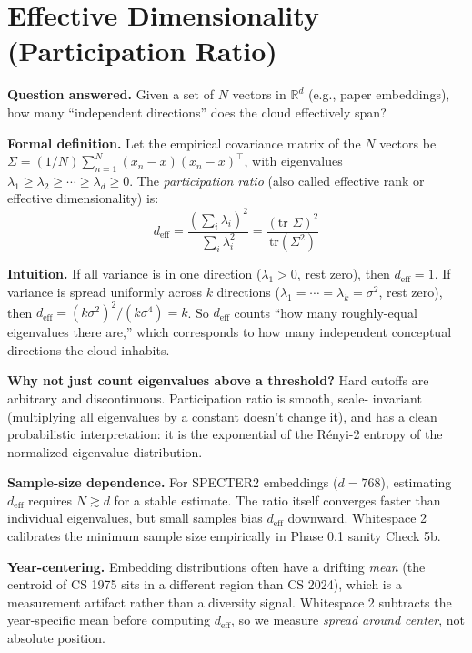 \documentclass[11pt]{article}
\begin{document}
\section{Effective Dimensionality (Participation Ratio)}
\label{sec:participation-ratio}

\textbf{Question answered.} Given a set of $N$ vectors in
$\mathbb{R}^d$ (e.g., paper embeddings), how many ``independent
directions'' does the cloud effectively span?

\textbf{Formal definition.} Let the empirical covariance matrix
of the $N$ vectors be $\Sigma = (1/N) \sum_{n=1}^N (x_n - \bar x)
(x_n - \bar x)^\top$, with eigenvalues $\lambda_1 \ge \lambda_2
\ge \cdots \ge \lambda_d \ge 0$. The \textit{participation ratio}
(also called effective rank or effective dimensionality) is:
\[
  d_{\text{eff}} = \frac{(\sum_i \lambda_i)^2}{\sum_i \lambda_i^2}
  = \frac{(\text{tr } \Sigma)^2}{\text{tr}(\Sigma^2)}
\]

\textbf{Intuition.} If all variance is in one direction
($\lambda_1 > 0$, rest zero), then $d_{\text{eff}} = 1$. If variance is
spread uniformly across $k$ directions
($\lambda_1 = \cdots = \lambda_k = \sigma^2$, rest zero), then
$d_{\text{eff}} = (k \sigma^2)^2 / (k \sigma^4) = k$. So
$d_{\text{eff}}$ counts ``how many roughly-equal eigenvalues there are,''
which corresponds to how many independent conceptual directions the
cloud inhabits.

\textbf{Why not just count eigenvalues above a threshold?} Hard cutoffs
are arbitrary and discontinuous. Participation ratio is smooth, scale-
invariant (multiplying all eigenvalues by a constant doesn't change it),
and has a clean probabilistic interpretation: it is the exponential of
the Rényi-2 entropy of the normalized eigenvalue distribution.

\textbf{Sample-size dependence.} For SPECTER2 embeddings
($d = 768$), estimating $d_{\text{eff}}$ requires $N \gtrsim d$ for a
stable estimate. The ratio itself converges faster than individual
eigenvalues, but small samples bias $d_{\text{eff}}$ downward.
Whitespace 2 calibrates the minimum sample size empirically in Phase 0.1
sanity Check 5b.

\textbf{Year-centering.} Embedding distributions often have a drifting
\textit{mean} (the centroid of CS 1975 sits in a different region than
CS 2024), which is a measurement artifact rather than a diversity signal.
Whitespace 2 subtracts the year-specific mean before computing
$d_{\text{eff}}$, so we measure \textit{spread around center}, not
absolute position.
\end{document}
